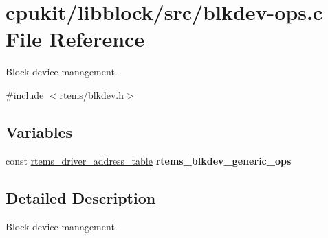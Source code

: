 \hypertarget{blkdev-ops_8c}{}\section{cpukit/libblock/src/blkdev-\/ops.c File Reference}
\label{blkdev-ops_8c}


Block device management.  


{\ttfamily \#include $<$rtems/blkdev.\+h$>$}\newline
\subsection*{Variables}
\begin{DoxyCompactItemize}
\item 
const \mbox{\hyperlink{structrtems__driver__address__table}{rtems\+\_\+driver\+\_\+address\+\_\+table}} {\bfseries rtems\+\_\+blkdev\+\_\+generic\+\_\+ops}
\end{DoxyCompactItemize}


\subsection{Detailed Description}
Block device management. 

